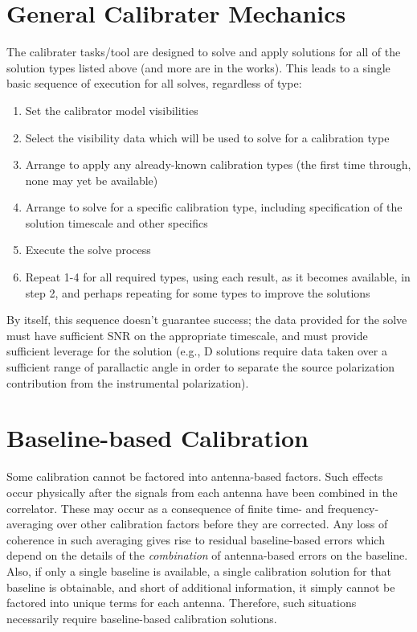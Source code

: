 \section{General Calibrater Mechanics}
\label{section:caltool.mech}

The calibrater tasks/tool are designed to solve and apply solutions
for all of the solution types listed above (and more are in the
works). This leads to a single basic sequence of execution for all
solves, regardless of type: 

\begin{enumerate}
   \item Set the calibrator model visibilities
   \item Select the visibility data which will be used to solve for a
      calibration type 
   \item Arrange to apply any already-known calibration types (the first
      time through, none may yet be available) 
   \item Arrange to solve for a specific calibration type, including
      specification of the solution timescale and other specifics 
   \item Execute the solve process
   \item Repeat 1-4 for all required types, using each result, as it
      becomes available, in step 2, and perhaps repeating for some types
      to improve the solutions  
\end{enumerate}

By itself, this sequence doesn't guarantee success; the data provided
for the solve must have sufficient SNR on the appropriate timescale,
and must provide sufficient leverage for the solution (e.g., D
solutions require data taken over a sufficient range of parallactic
angle in order to separate the source polarization contribution from
the instrumental polarization). 

\section{Baseline-based Calibration}
\label{section:caltool.BLcal}

Some calibration cannot be factored into antenna-based factors.  Such
effects occur physically after the signals from each antenna have been
combined in the correlator.  These may occur as a consequence of
finite time- and frequency-averaging over other calibration factors
before they are corrected.  Any loss of coherence in such averaging
gives rise to residual baseline-based errors which depend on the
details of the {\it combination} of antenna-based errors on the
baseline.  Also, if only a single baseline is available, a single
calibration solution for that baseline is obtainable, and short of
additional information, it simply cannot be factored into unique terms
for each antenna.  Therefore, such situations necessarily require
baseline-based calibration solutions.

